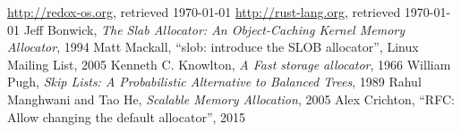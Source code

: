 \documentclass[11pt]{article}
\begin{document}
    \begin{thebibliography}{9}
            \url{http://redox-os.org},
            retrieved \today
            \url{http://rust-lang.org},
            retrieved \today
            Jeff Bonwick,
            \emph{The Slab Allocator: An Object-Caching Kernel Memory Allocator},
            1994
            Matt Mackall,
            ``slob: introduce the SLOB allocator'',
            Linux Mailing List,
            2005
             Kenneth C. Knowlton,
             \emph{A Fast storage allocator},
             1966
            William Pugh,
            \emph{Skip Lists: A Probabilistic Alternative to Balanced Trees},
            1989
             Rahul Manghwani and Tao He,
             \emph{Scalable Memory Allocation},
             2005
            Alex Crichton,
            ``RFC: Allow changing the default allocator'',
            2015
    \end{thebibliography}
\end{document}
